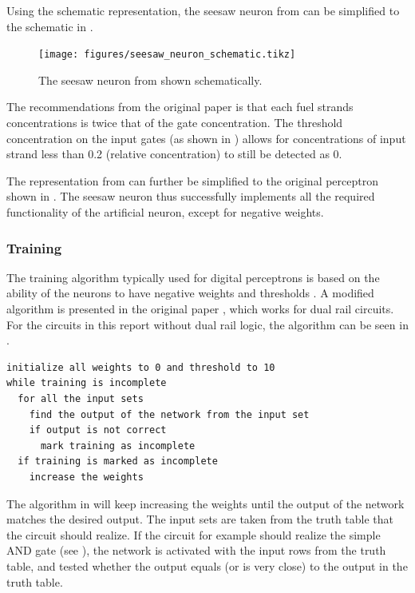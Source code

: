 Using the schematic representation, the seesaw neuron from  can be simplified to the schematic in .

\begin{figure}[h]
  \texttt{[image: figures/seesaw\_neuron\_schematic.tikz]}
  \caption{The seesaw neuron from  shown schematically.}
  \label{seesaw_neuron_schematic}
\end{figure}

The recommendations from the original paper \cite{Qian2011} is that each fuel strands concentrations is twice that of the gate concentration. The threshold concentration on the input gates (as shown in ) allows for concentrations of input strand less than 0.2 (relative concentration) to still be detected as 0.

The representation from  can further be simplified to the original perceptron shown in . The seesaw neuron thus successfully implements all the required functionality of the artificial neuron, except for negative weights.

\subsubsection{Training}
The training algorithm typically used for digital perceptrons is based on the ability of the neurons to have negative weights and thresholds \cite{Gallant1990}. A modified algorithm is presented in the original paper \cite{Qian2011}, which works for dual rail circuits. For the circuits in this report without dual rail logic, the algorithm can be seen in .

\begin{lstlisting}[float,floatplacement=h,caption=Pseudocode for the seesaw perceptron training algorithm, label=codetraining]
initialize all weights to 0 and threshold to 10
while training is incomplete
  for all the input sets
    find the output of the network from the input set
    if output is not correct
      mark training as incomplete
  if training is marked as incomplete
    increase the weights
\end{lstlisting}

The algorithm in  will keep increasing the weights until the output of the network matches the desired output. The input sets are taken from the truth table that the circuit should realize. If the circuit for example should realize the simple AND gate (see ), the network is activated with the input rows from the truth table, and tested whether the output equals (or is very close) to the output in the truth table.

